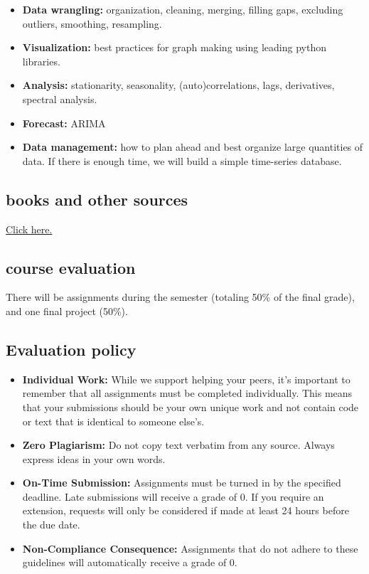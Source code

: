 \documentclass[
  letterpaper,
  DIV=11,
  numbers=noendperiod]{scrreprt}
\providecommand{\tightlist}{%
  \setlength{\itemsep}{0pt}\setlength{\parskip}{0pt}}\usepackage{longtable,booktabs,array}
\begin{document}
\begin{itemize}
\tightlist
\item
  \textbf{Data wrangling:} organization, cleaning, merging, filling
  gaps, excluding outliers, smoothing, resampling.
\item
  \textbf{Visualization:} best practices for graph making using leading
  python libraries.
\item
  \textbf{Analysis:} stationarity, seasonality, (auto)correlations,
  lags, derivatives, spectral analysis.
\item
  \textbf{Forecast:} ARIMA
\item
  \textbf{Data management:} how to plan ahead and best organize large
  quantities of data. If there is enough time, we will build a simple
  time-series database.
\end{itemize}

\subsection*{books and other sources}\label{books-and-other-sources}

\href{references.html}{Click here.}

\subsection*{course evaluation}\label{course-evaluation}

There will be assignments during the semester (totaling 50\% of the
final grade), and one final project (50\%).

\subsection*{Evaluation policy}\label{evaluation-policy}

\begin{itemize}
\item
  \textbf{Individual Work:} While we support helping your peers, it's
  important to remember that all assignments must be completed
  individually. This means that your submissions should be your own
  unique work and not contain code or text that is identical to someone
  else's.
\item
  \textbf{Zero Plagiarism:} Do not copy text verbatim from any source.
  Always express ideas in your own words.
\item
  \textbf{On-Time Submission:} Assignments must be turned in by the
  specified deadline. Late submissions will receive a grade of 0. If you
  require an extension, requests will only be considered if made at
  least 24 hours before the due date.
\item
  \textbf{Non-Compliance Consequence:} Assignments that do not adhere to
  these guidelines will automatically receive a grade of 0.
\end{itemize}
\end{document}
